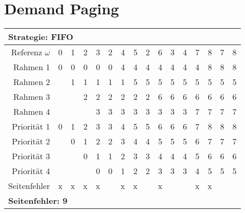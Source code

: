 \documentclass[a4paper, 11pt]{article}
\begin{document}
    \section{Demand Paging}
    \setlength{\tabcolsep}{3.5mm}
      \renewcommand{\arraystretch}{1.2}
      \begin{center}
      \begin{tabular}{|r||r|r|r|r|r|r|r|r|r|r|r|r|r|r|r|}
      \multicolumn{16}{l}{\textbf{Strategie: FIFO}}\\
      \hline
            Referenz $\omega$ & 0 & 1 & 2 & 3 & 2 & 4 & 5 & 2 & 6 & 3 & 4 & 7 & 8 & 7 & 8 \\
      \hline\hline
            Rahmen 1    & 0  & 0  &0   & 0  & 0  & 4  & 4  &  4 & 4  & 4  & 4  & 4  & 8  & 8  & 8  \\\hline
            Rahmen 2    &    &  1 &  1 &  1 & 1  & 1  & 5  &  5 & 5  &5   & 5  & 5  & 5  & 5  & 5  \\\hline
            Rahmen 3    &    &    &  2 &  2 & 2  & 2  & 2  & 2  & 6  & 6  & 6  & 6  & 6  & 6  & 6  \\\hline
            Rahmen 4    &    &    &    &  3 &  3 & 3  & 3  & 3  & 3  & 3  & 3  & 7  & 7  & 7  & 7  \\
      \hline\hline
            Priorität 1 & 0  & 1  & 2  & 3  & 3  & 4  & 5  & 5  & 6  & 6  & 6  & 7  & 8  & 8  & 8  \\\hline
            Priorität 2 &    & 0  & 1  & 2  & 2  &  3 & 4  & 4  & 5  & 5  & 5  & 6  & 7  & 7  & 7  \\\hline
            Priorität 3 &    &    & 0  & 1  & 1  & 2  & 3  & 3  & 4  & 4  & 4  & 5  & 6  & 6  & 6  \\\hline
            Priorität 4 &    &    &    & 0  & 0  & 1  &2   &2   & 3  & 3  & 3  & 4  & 5  & 5  & 5  \\
      \hline\hline
            Seitenfehler  & x  & x  & x  & x  &   & x  & x  &   & x  &   &   & x  & x  &   &   \\
      \hline
      \multicolumn{16}{l}{\textbf{Seitenfehler: 9}}\\
      \end{tabular}
      \end{center}

      \vfill
\end{document}
